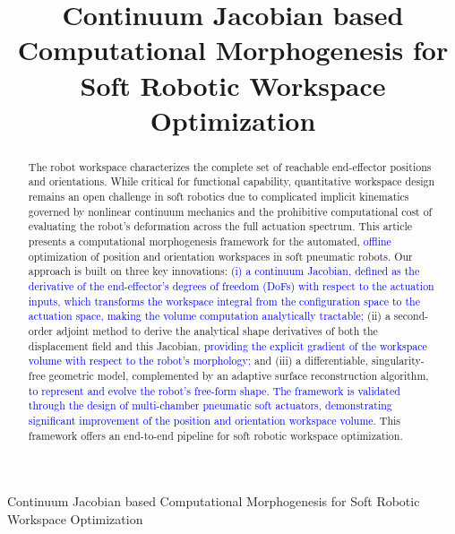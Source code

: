 \documentclass[journal]{IEEEtran}
\theoremstyle{definition}
\begin{document}
%
\title{Continuum Jacobian based Computational Morphogenesis for Soft Robotic Workspace Optimization}


%
{Continuum Jacobian based Computational Morphogenesis for Soft Robotic Workspace Optimization}

\maketitle

\begin{abstract}
The robot workspace characterizes the complete set of reachable end-effector positions and orientations. While critical for functional capability, quantitative workspace design remains an open challenge in soft robotics due to complicated implicit kinematics governed by nonlinear continuum mechanics and the prohibitive computational cost of evaluating the robot's deformation across the full actuation spectrum. This article presents a computational morphogenesis framework for the automated, \textcolor{blue}{offline} optimization of position and orientation workspaces in soft pneumatic robots. Our approach is built on three key innovations: \textcolor{blue}{(i) a continuum Jacobian, defined as the derivative of the end-effector's degrees of freedom (DoFs) with respect to the actuation inputs, which transforms the workspace integral from the configuration space to the actuation space, making the volume computation analytically tractable;} (ii) a second-order adjoint method to derive the analytical shape derivatives of both the displacement field and this Jacobian, \textcolor{blue}{providing the explicit gradient of the workspace volume with respect to the robot's morphology;} and (iii) a differentiable, singularity-free geometric model, complemented by an adaptive surface reconstruction algorithm, \textcolor{blue}{to represent and evolve the robot's free-form shape}. \textcolor{blue}{The framework is validated through the design of multi-chamber pneumatic soft actuators, demonstrating significant improvement of the position and orientation workspace volume.} This framework offers an end-to-end pipeline for soft robotic workspace optimization.
\end{abstract}
\end{document}
